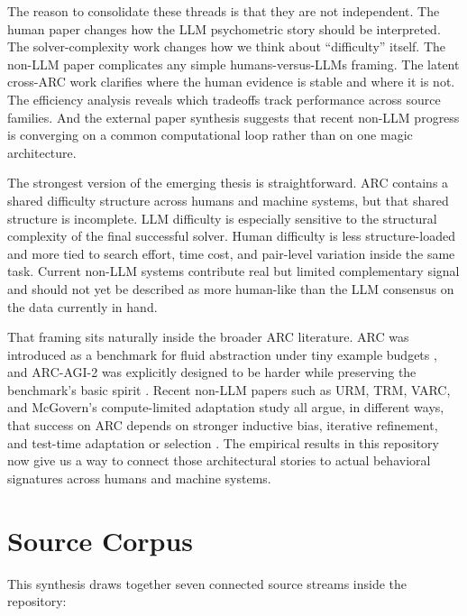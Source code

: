\documentclass[11pt,letterpaper]{article}
\begin{document}
The reason to consolidate these threads is that they are not independent. The human paper changes how the LLM psychometric story should be interpreted. The solver-complexity work changes how we think about ``difficulty'' itself. The non-LLM paper complicates any simple humans-versus-LLMs framing. The latent cross-ARC work clarifies where the human evidence is stable and where it is not. The efficiency analysis reveals which tradeoffs track performance across source families. And the external paper synthesis suggests that recent non-LLM progress is converging on a common computational loop rather than on one magic architecture.

The strongest version of the emerging thesis is straightforward. ARC contains a shared difficulty structure across humans and machine systems, but that shared structure is incomplete. LLM difficulty is especially sensitive to the structural complexity of the final successful solver. Human difficulty is less structure-loaded and more tied to search effort, time cost, and pair-level variation inside the same task. Current non-LLM systems contribute real but limited complementary signal and should not yet be described as more human-like than the LLM consensus on the data currently in hand.

That framing sits naturally inside the broader ARC literature. ARC was introduced as a benchmark for fluid abstraction under tiny example budgets \cite{chollet2019arc}, and ARC-AGI-2 was explicitly designed to be harder while preserving the benchmark's basic spirit \cite{arcprizefoundation2025}. Recent non-LLM papers such as URM, TRM, VARC, and McGovern's compute-limited adaptation study all argue, in different ways, that success on ARC depends on stronger inductive bias, iterative refinement, and test-time adaptation or selection \cite{gao2025urm, hu2025varc, jolicoeur2025trm, mcgovern2025ttatrm}. The empirical results in this repository now give us a way to connect those architectural stories to actual behavioral signatures across humans and machine systems.

\section{Source Corpus}

This synthesis draws together seven connected source streams inside the repository:
\end{document}
